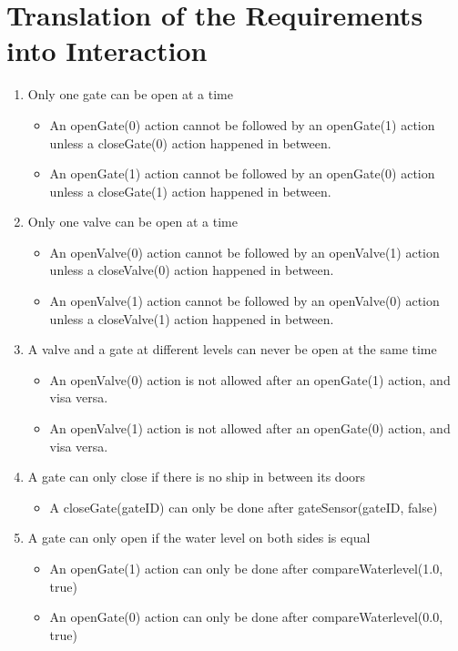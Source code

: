 \section{Translation of the Requirements into Interaction}
\begin{enumerate}
	\item Only one gate can be open at a time	
	\begin{itemize}
		\item An openGate(0) action cannot be followed by an openGate(1) action unless a closeGate(0) action happened in between.
		\item An openGate(1) action cannot be followed by an openGate(0) action unless a closeGate(1) action happened in between.
		
	\end{itemize}
	
	\item Only one valve can be open at a time	
	\begin{itemize}
		\item An openValve(0) action cannot be followed by an openValve(1) action unless a closeValve(0) action happened in between.
		\item An openValve(1) action cannot be followed by an openValve(0) action unless a closeValve(1) action happened in between.
	\end{itemize}
	
	\item A valve and a gate at different levels can never be open at the same time
	\begin{itemize}
		\item An openValve(0) action is not allowed after an openGate(1) action, and visa versa.
		\item An openValve(1) action is not allowed after an openGate(0) action, and visa versa.
	\end{itemize}
	
	\item A gate can only close if there is no ship in between its doors
	\begin{itemize}
		\item A closeGate(gateID) can only be done after gateSensor(gateID, false)
	\end{itemize}
	
	\item A gate can only open if the water level on both sides is equal
	\begin{itemize}
		\item An openGate(1) action can only be done after compareWaterlevel(1.0, true)
		\item An openGate(0) action can only be done after compareWaterlevel(0.0, true)
	\end{itemize}
	

\end{enumerate}
